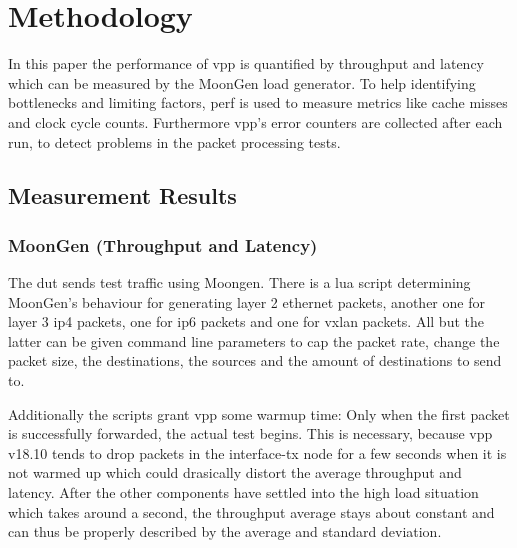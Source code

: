 
\chapter{Methodology}
\label{sec:methodology}






In this paper the performance of \Ac{vpp} is quantified by throughput
and latency which can be measured by the MoonGen
\cite{emmerich2015moongen} load generator. To help identifying
bottlenecks and limiting factors, \Ac{perf} is used to measure metrics
like cache misses and clock cycle counts. Furthermore \Ac{vpp}'s error
counters are collected after each run, to detect problems in the
packet processing tests.


\section{Measurement Results}



\subsection{MoonGen (Throughput and Latency)} 


The \Ac{dut} sends test traffic using Moongen. There is a lua script
determining MoonGen's behaviour for generating layer 2 ethernet
packets, another one for layer 3 \Ac{ip4} packets, one for \Ac{ip6}
packets and one for \Ac{vxlan} packets. All but the latter can be
given command line parameters to cap the packet rate, change the
packet size, the destinations, the sources and the amount of
destinations to send to.

Additionally the scripts grant \Ac{vpp} some warmup time: Only when
the first packet is successfully forwarded, the actual test begins.
This is necessary, because \Ac{vpp} v18.10 tends to drop packets in
the interface-tx node for a few seconds when it is not warmed up which
could drasically distort the average throughput and latency. After the
other components have settled into the high load situation which takes
around a second, the throughput average stays about constant and can
thus be properly described by the average and standard deviation.

